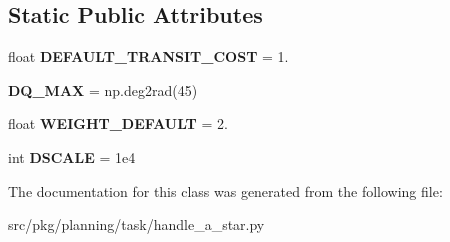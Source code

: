 \subsection*{Static Public Attributes}
\begin{DoxyCompactItemize}
\item 
\mbox{\label{classrnb-planning_1_1src_1_1pkg_1_1planning_1_1task_1_1handle__a__star_1_1_handle_astar_ad49512378fe3b5152f54ffb7af7077a8}} 
float {\bfseries D\+E\+F\+A\+U\+L\+T\+\_\+\+T\+R\+A\+N\+S\+I\+T\+\_\+\+C\+O\+ST} = 1.
\item 
\mbox{\label{classrnb-planning_1_1src_1_1pkg_1_1planning_1_1task_1_1handle__a__star_1_1_handle_astar_a4a00c1ac452597e6a050f9339f88763a}} 
{\bfseries D\+Q\+\_\+\+M\+AX} = np.\+deg2rad(45)
\item 
\mbox{\label{classrnb-planning_1_1src_1_1pkg_1_1planning_1_1task_1_1handle__a__star_1_1_handle_astar_a1f273e568a5d59579a91728cb37b1af1}} 
float {\bfseries W\+E\+I\+G\+H\+T\+\_\+\+D\+E\+F\+A\+U\+LT} = 2.
\item 
\mbox{\label{classrnb-planning_1_1src_1_1pkg_1_1planning_1_1task_1_1handle__a__star_1_1_handle_astar_af0c9b2be131e3dffc0d24ff244e3889c}} 
int {\bfseries D\+S\+C\+A\+LE} = 1e4
\end{DoxyCompactItemize}


The documentation for this class was generated from the following file\+:\begin{DoxyCompactItemize}
\item 
src/pkg/planning/task/handle\+\_\+a\+\_\+star.\+py\end{DoxyCompactItemize}
